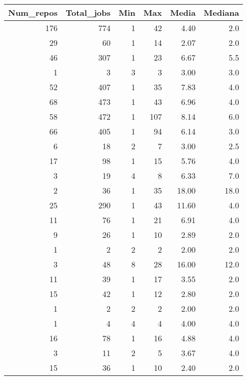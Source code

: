\begin{tabular}{rrrrrr}
\toprule
 Num\_repos &  Total\_jobs &  Min &  Max &  Media &  Mediana \\
\midrule
       176 &         774 &    1 &   42 &   4.40 &      2.0 \\
        29 &          60 &    1 &   14 &   2.07 &      2.0 \\
        46 &         307 &    1 &   23 &   6.67 &      5.5 \\
         1 &           3 &    3 &    3 &   3.00 &      3.0 \\
        52 &         407 &    1 &   35 &   7.83 &      4.0 \\
        68 &         473 &    1 &   43 &   6.96 &      4.0 \\
        58 &         472 &    1 &  107 &   8.14 &      6.0 \\
        66 &         405 &    1 &   94 &   6.14 &      3.0 \\
         6 &          18 &    2 &    7 &   3.00 &      2.5 \\
        17 &          98 &    1 &   15 &   5.76 &      4.0 \\
         3 &          19 &    4 &    8 &   6.33 &      7.0 \\
         2 &          36 &    1 &   35 &  18.00 &     18.0 \\
        25 &         290 &    1 &   43 &  11.60 &      4.0 \\
        11 &          76 &    1 &   21 &   6.91 &      4.0 \\
         9 &          26 &    1 &   10 &   2.89 &      2.0 \\
         1 &           2 &    2 &    2 &   2.00 &      2.0 \\
         3 &          48 &    8 &   28 &  16.00 &     12.0 \\
        11 &          39 &    1 &   17 &   3.55 &      2.0 \\
        15 &          42 &    1 &   12 &   2.80 &      2.0 \\
         1 &           2 &    2 &    2 &   2.00 &      2.0 \\
         1 &           4 &    4 &    4 &   4.00 &      4.0 \\
        16 &          78 &    1 &   16 &   4.88 &      4.0 \\
         3 &          11 &    2 &    5 &   3.67 &      4.0 \\
        15 &          36 &    1 &   10 &   2.40 &      2.0 \\

\end{tabular}
